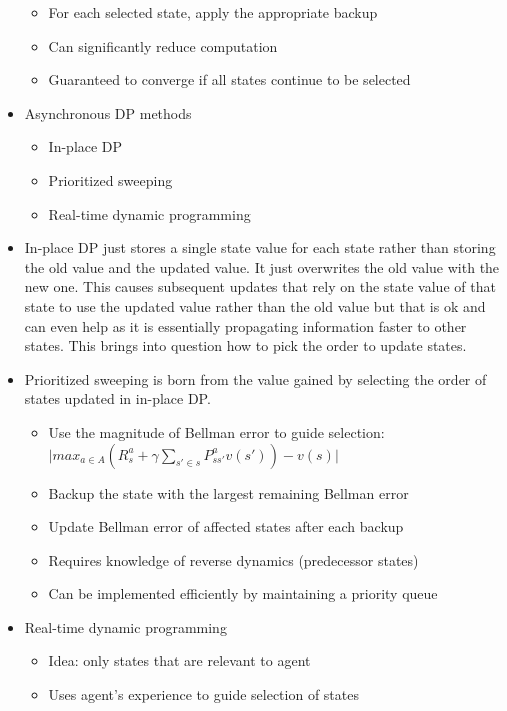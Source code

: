 \documentclass[12pt]{article}
\begin{document}
\begin{itemize}
\begin{itemize}
      \item For each selected state, apply the appropriate backup
      \item Can significantly reduce computation
      \item Guaranteed to converge if all states continue to be selected
    \end{itemize}
    \item Asynchronous DP methods
    \begin{itemize}
      \item In-place DP
      \item Prioritized sweeping
      \item Real-time dynamic programming
    \end{itemize}
    \item In-place DP just stores a single state value for each state
    rather than storing the old value and the updated value. It just overwrites
    the old value with the new one. This causes subsequent updates that rely on 
    the state value of that state to use the updated value rather than the old value
    but that is ok and can even help as it is essentially propagating information faster
    to other states. This brings into question how to pick the order to update states.
    \item Prioritized sweeping is born from the value gained by selecting the order of states
    updated in in-place DP.
    \begin{itemize}
      \item Use the magnitude of Bellman error to guide selection: \\
      $\vert max_{a \in A}(R_s^a + \gamma \sum_{s' \in s}P_{ss'}^a v(s')) - v(s)\vert$
      \item Backup the state with the largest remaining Bellman error
      \item Update Bellman error of affected states after each backup
      \item Requires knowledge of reverse dynamics (predecessor states)
      \item Can be implemented efficiently by maintaining a priority queue
    \end{itemize}
    \item Real-time dynamic programming
    \begin{itemize}
      \item Idea: only states that are relevant to agent
      \item Uses agent's experience to guide selection of states

\end{itemize}
\end{itemize}
\end{document}

